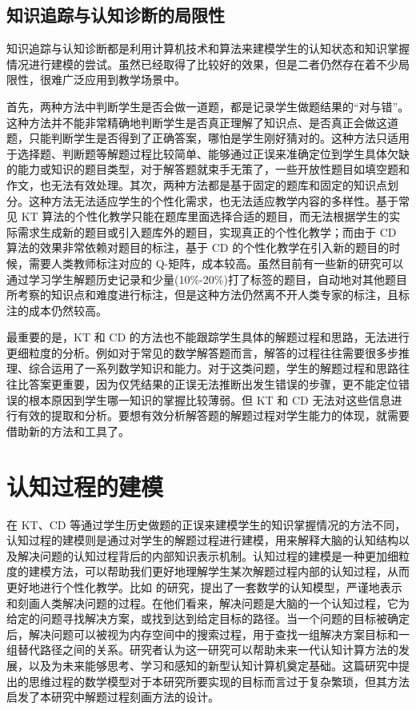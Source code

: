 \subsection{知识追踪与认知诊断的局限性}

知识追踪与认知诊断都是利用计算机技术和算法来建模学生的认知状态和知识掌握情况进行建模的尝试。虽然已经取得了比较好的效果，但是二者仍然存在着不少局限性，很难广泛应用到教学场景中。

首先，两种方法中判断学生是否会做一道题，都是记录学生做题结果的“对与错”。这种方法并不能非常精确地判断学生是否真正理解了知识点、是否真正会做这道题，只能判断学生是否得到了正确答案，哪怕是学生刚好猜对的。这种方法只适用于选择题、判断题等解题过程比较简单、能够通过正误来准确定位到学生具体欠缺的能力或知识的题目类型，对于解答题就束手无策了，一些开放性题目如填空题和作文，也无法有效处理。其次，两种方法都是基于固定的题库和固定的知识点划分。这种方法无法适应学生的个性化需求，也无法适应教学内容的多样性。基于常见 KT 算法的个性化教学只能在题库里面选择合适的题目，而无法根据学生的实际需求生成新的题目或引入题库外的题目，实现真正的个性化教学；而由于 CD 算法的效果非常依赖对题目的标注，基于 CD 的个性化教学在引入新的题目的时候，需要人类教师标注对应的 Q-矩阵，成本较高。虽然目前有一些新的研究可以通过学习学生解题历史记录和少量(10\%-20\%)打了标签的题目，自动地对其他题目所考察的知识点和难度进行标注\cite{chen2024disentangling}，但是这种方法仍然离不开人类专家的标注，且标注的成本仍然较高。

最重要的是，KT 和 CD 的方法也不能跟踪学生具体的解题过程和思路，无法进行更细粒度的分析。例如对于常见的数学解答题而言，解答的过程往往需要很多步推理、综合运用了一系列数学知识和能力。对于这类问题，学生的解题过程和思路往往比答案更重要，因为仅凭结果的正误无法推断出发生错误的步骤，更不能定位错误的根本原因到学生哪一知识的掌握比较薄弱。但 KT 和 CD 无法对这些信息进行有效的提取和分析。要想有效分析解答题的解题过程对学生能力的体现，就需要借助新的方法和工具了。


\section{认知过程的建模}

在 KT、CD 等通过学生历史做题的正误来建模学生的知识掌握情况的方法不同，认知过程的建模则是通过对学生的解题过程进行建模，用来解释大脑的认知结构以及解决问题的认知过程背后的内部知识表示机制。认知过程的建模是一种更加细粒度的建模方法，可以帮助我们更好地理解学生某次解题过程内部的认知过程，从而更好地进行个性化教学。比如\citet{wang2010cognitive} 的研究，提出了一套数学的认知模型，严谨地表示和刻画人类解决问题的过程。在他们看来，解决问题是大脑的一个认知过程，它为给定的问题寻找解决方案，或找到达到给定目标的路径。当一个问题的目标被确定后，解决问题可以被视为内存空间中的搜索过程，用于查找一组解决方案目标和一组替代路径之间的关系。研究者认为这一研究可以帮助未来一代认知计算方法的发展，以及为未来能够思考、学习和感知的新型认知计算机奠定基础。这篇研究中提出的思维过程的数学模型对于本研究所要实现的目标而言过于复杂繁琐，但其方法启发了本研究中解题过程刻画方法的设计。

